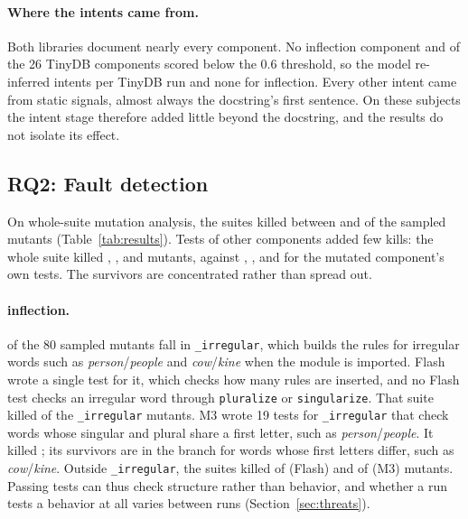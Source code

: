 \documentclass[11pt]{article}
\newcommand{\code}[1]{\texttt{#1}}
\begin{document}
\paragraph{Where the intents came from.}
Both libraries document nearly every component.
No inflection component and \TinyDBFlashIntentsBelow{} of the 26 TinyDB components scored below the 0.6 threshold, so the model re-inferred \TinyDBFlashIntentsFromModel{} intents per TinyDB run and none for inflection.
Every other intent came from static signals, almost always the docstring's first sentence.
On these subjects the intent stage therefore added little beyond the docstring, and the results do not isolate its effect.

\subsection{RQ2: Fault detection}
On whole-suite mutation analysis, the suites killed between \MinMutationScore{} and \MaxMutationScore{} of the sampled mutants (Table~\ref{tab:results}).
Tests of other components added few kills: the whole suite killed \InflectionFlashKilled{}, \InflectionMThreeKilled{}, \TinyDBFlashKilled{} and \TinyDBMThreeKilled{} mutants, against \InflectionFlashKilledOwn{}, \InflectionMThreeKilledOwn{}, \TinyDBFlashKilledOwn{} and \TinyDBMThreeKilledOwn{} for the mutated component's own tests.
The survivors are concentrated rather than spread out.

\paragraph{inflection.}
\InflectionFlashTopMutants{} of the 80 sampled mutants fall in \code{\_irregular}, which builds the rules for irregular words such as \emph{person}/\emph{people} and \emph{cow}/\emph{kine} when the module is imported.
Flash wrote a single test for it, which checks how many rules are inserted, and no Flash test checks an irregular word through \code{pluralize} or \code{singularize}.
That suite killed \InflectionFlashTopKilled{} of the \InflectionFlashTopMutants{} \code{\_irregular} mutants.
M3 wrote 19 tests for \code{\_irregular} that check words whose singular and plural share a first letter, such as \emph{person}/\emph{people}.
It killed \InflectionMThreeTopKilled{}; its survivors are in the branch for words whose first letters differ, such as \emph{cow}/\emph{kine}.
Outside \code{\_irregular}, the suites killed \InflectionFlashRestKilled{} of \InflectionFlashRestMutants{} (Flash) and \InflectionMThreeRestKilled{} of \InflectionMThreeRestMutants{} (M3) mutants.
Passing tests can thus check structure rather than behavior, and whether a run tests a behavior at all varies between runs (Section~\ref{sec:threats}).
\end{document}
